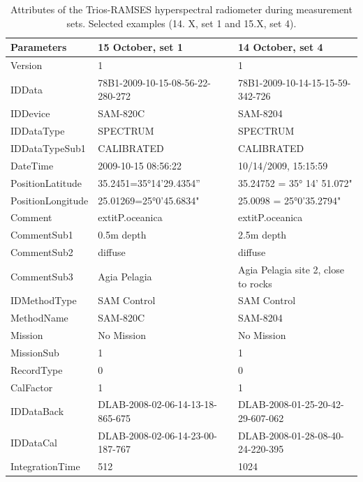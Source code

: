 \documentclass[10pt, a4paper]{article}
\begin{document}
\begin{appendices}
\begin{table}[H]
	\caption{Attributes of the Trios-RAMSES hyperspectral radiometer during measurement sets. Selected examples (14. X, set 1 and 15.X, set 4).}\label{tab:A.1}
	\centering
	  \begin{tabular}{| p{3cm} | p{3cm} | p{5cm} |}
		\hline
		    \textbf{Parameters} & \textbf{15 October, set 1} & \textbf{14 October, set 4} \\ \hline \hline
		     Version &1 & 1 \\ \hline
		     IDData & 78B1-2009-10-15-08-56-22-280-272 & 78B1-2009-10-14-15-15-59-342-726 \\ \hline
		     IDDevice & SAM-820C & SAM-8204\\ \hline
		     IDDataType & SPECTRUM & SPECTRUM \\ \hline
		     IDDataTypeSub1 & CALIBRATED & CALIBRATED \\ \hline
		     DateTime & 2009-10-15 08:56:22 & 10/14/2009, 15:15:59 \\ \hline
		     PositionLatitude & 35.2451=35°14'29.4354” & 35.24752 = 35° 14' 51.072" \\ \hline
		     PositionLongitude & 25.01269=25°0'45.6834" & 25.0098 = 25°0'35.2794" \\ \hline
		     Comment & 	extit{P.oceanica} & 	extit{P.oceanica} \\ \hline
		     CommentSub1 & 0.5m depth & 2.5m depth \\ \hline
		     CommentSub2 & diffuse & diffuse \\ \hline
		     CommentSub3 & Agia Pelagia & Agia Pelagia site 2, close to rocks \\ \hline
		     IDMethodType & SAM Control & SAM Control \\ \hline
		    MethodName & SAM-820C & SAM-8204 \\ \hline
		    Mission & No Mission & No Mission \\ \hline
		    MissionSub & 1 & 1 \\ \hline
		    RecordType & 0 & 0 \\ \hline
		    CalFactor & 1 & 1 \\ \hline
		   IDDataBack & DLAB-2008-02-06-14-13-18-865-675 & DLAB-2008-01-25-20-42-29-607-062 \\ \hline
		   IDDataCal & DLAB-2008-02-06-14-23-00-187-767 & DLAB-2008-01-28-08-40-24-220-395 \\ \hline
		   IntegrationTime & 512 & 1024 \\ \hline

\end{tabular}
\end{table}
\end{appendices}
\end{document}
